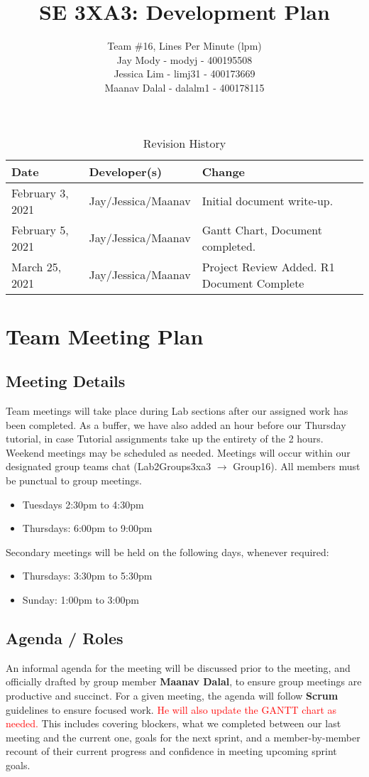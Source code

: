 \documentclass{article}
\title{\textbf{SE 3XA3: Development Plan}}
\author{Team \#16, Lines Per Minute (lpm) \\
Jay Mody - modyj - 400195508\\
Jessica Lim - limj31 - 400173669\\
Maanav Dalal - dalalm1 - 400178115\\
}
\begin{document}
\maketitle

\begin{table}[hp]
\caption{Revision History} \label{TblRevisionHistory}
\begin{tabularx}{\textwidth}{llX}
\toprule
\textbf{Date} & \textbf{Developer(s)} & \textbf{Change}\\
\midrule
February 3, 2021 & Jay/Jessica/Maanav & Initial document write-up. \\
February 5, 2021 & Jay/Jessica/Maanav & Gantt Chart, Document completed. \\
March 25, 2021 & Jay/Jessica/Maanav & Project Review Added. R1 Document Complete \\
\bottomrule
\end{tabularx}
\end{table}

\newpage

\section{Team Meeting Plan}
\subsection*{Meeting Details}
Team meetings will take place during Lab sections after our assigned work has been completed. As a buffer, we have also added
an hour before our Thursday tutorial, in case Tutorial assignments take up the entirety of the 2 hours. Weekend meetings may be scheduled as needed. Meetings will occur within our designated group teams chat (Lab2Groups3xa3 $\rightarrow$ Group16). All members must be punctual to group meetings.
\begin{itemize}
    \item Tuesdays 2:30pm to 4:30pm
    \item Thursdays: 6:00pm to 9:00pm
\end{itemize}
Secondary meetings will be held on the following days, whenever required:
\begin{itemize}
    \item Thursdays: 3:30pm to 5:30pm
    \item Sunday: 1:00pm to 3:00pm
\end{itemize}

\subsection*{Agenda / Roles}
An informal agenda for the meeting will be discussed prior to the meeting, and officially drafted by group member \textbf{Maanav Dalal}, to ensure group meetings are productive and succinct. For a given meeting, the agenda will follow \textbf{Scrum} guidelines to ensure focused work. \textcolor{red}{He will also update the GANTT chart as needed.} This includes covering blockers, what we completed between our last meeting and the current one, goals for the next sprint, and a member-by-member recount of their current progress and confidence in meeting upcoming sprint goals.
\end{document}
